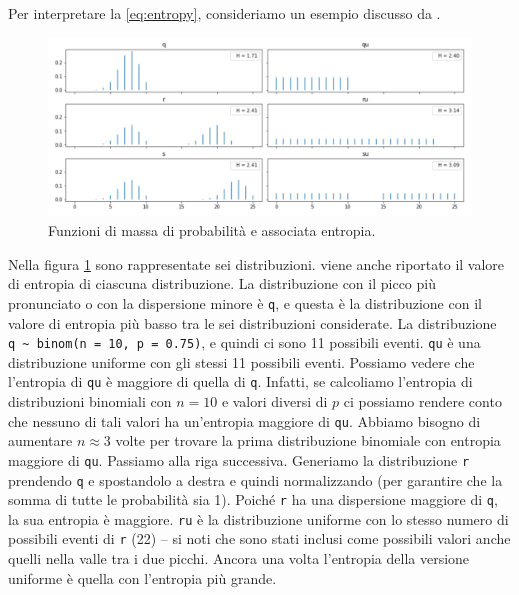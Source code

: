 \documentclass[
  10pt,
  italian,
  a4paper,
  extrafontsizes,onecolumn,openright
  ]{memoir}
\theoremstyle{definition}
\theoremstyle{definition}
\theoremstyle{definition}
\theoremstyle{definition}
\theoremstyle{remark}
\begin{document}
Per interpretare la \eqref{eq:entropy}, consideriamo un esempio discusso da \textcite{martin2022bayesian}.

\begin{figure}[h]

{\centering \includegraphics[width=1\linewidth]{images/entropy_example} 

}

\caption{Funzioni di massa di probabilità e associata entropia.}\label{fig:entropy-example}
\end{figure}

Nella figura \ref{fig:entropy-example} sono rappresentate sei distribuzioni. viene anche riportato il valore di entropia di ciascuna distribuzione. La distribuzione con il picco più pronunciato o con la dispersione minore è \texttt{q}, e questa è la distribuzione con il valore di entropia più basso tra le sei distribuzioni considerate. La distribuzione \texttt{q\ \textasciitilde{}\ binom(n\ =\ 10,\ p\ =\ 0.75)}, e quindi ci sono 11 possibili eventi. \texttt{qu} è una distribuzione uniforme con gli stessi 11 possibili eventi. Possiamo vedere che l'entropia di \texttt{qu} è maggiore di quella di \texttt{q}. Infatti, se calcoliamo l'entropia di distribuzioni binomiali con \(n = 10\) e valori diversi di \(p\) ci possiamo rendere conto che nessuno di tali valori ha un'entropia maggiore di \texttt{qu}. Abbiamo bisogno di aumentare \(n ≈ 3\) volte per trovare la prima distribuzione binomiale con entropia maggiore di \texttt{qu}. Passiamo alla riga successiva. Generiamo la distribuzione \texttt{r} prendendo \texttt{q} e spostandolo a destra e quindi normalizzando (per garantire che la somma di tutte le probabilità sia 1). Poiché \texttt{r} ha una dispersione maggiore di \texttt{q}, la sua entropia è maggiore. \texttt{ru} è la distribuzione uniforme con lo stesso numero di possibili eventi di \texttt{r} (22) -- si noti che sono stati inclusi come possibili valori anche quelli nella valle tra i due picchi. Ancora una volta l'entropia della versione uniforme è quella con l'entropia più grande.
\end{document}
